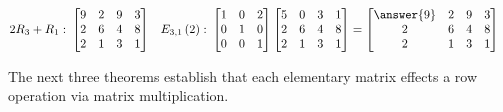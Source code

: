 \documentclass{ximera}
\begin{document}
\begin{example}
\begin{align*}
\rowopadd{2}{3}{1}:\ &
\begin{bmatrix}
9 & 2 & 9 & 3\\
2 & 6 & 4 & 8\\
2 & 1 & 3 & 1
\end{bmatrix}
&
\elemadd{2}{3}{1}:\ &
\begin{bmatrix}
1 & 0 & 2\\
0 & 1 & 0\\
0 & 0 & 1
\end{bmatrix}
\begin{bmatrix}
5 & 0 & 3 & 1\\
2 & 6 & 4 & 8\\
2 & 1 & 3 & 1
\end{bmatrix}
=
\begin{bmatrix}
\answer{9} & 2 & 9 & 3\\
2 & 6 & 4 & 8\\
2 & 1 & 3 & 1
\end{bmatrix}
\end{align*}


\end{example}

The next three theorems establish that each elementary matrix effects a row operation via matrix multiplication.
\end{document}
